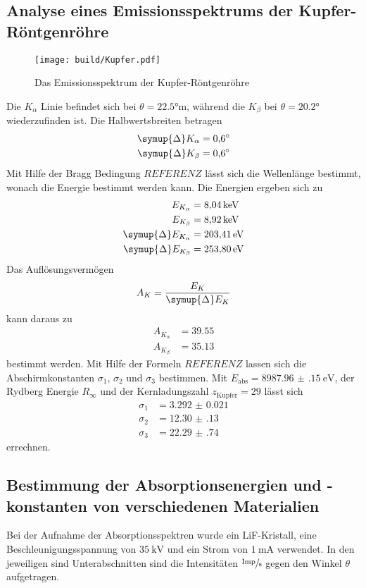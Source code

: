 \subsection{Analyse eines Emissionsspektrums der Kupfer-Röntgenröhre}
\begin{figure}
    \centering
    \caption{Das Emissionsspektrum der Kupfer-Röntgenröhre}
    \label{fig:Kupfer}
    \texttt{[image: build/Kupfer.pdf]}
\end{figure}
Die $K_\alpha$ Linie befindet sich bei  $\theta = \ang{22.5;;}$m, während die $K_\beta$ bei  $\theta = \ang{20.2;;}$ wiederzufinden ist.
Die Halbwertsbreiten betragen
\begin{align*}
    \symup{\Delta}K_\alpha  &= \ang{0.6;;} \\
    \symup{\Delta}K_\beta   &= \ang{0.6;;}
\end{align*}
Mit Hilfe der Bragg Bedingung $REFERENZ$ lässt sich die Wellenlänge bestimmt, wonach die Energie bestimmt werden kann.
Die Energien ergeben sich zu 
\begin{align*}
    E_{K_\alpha} & =  \SI{8.04}{\kilo\electronvolt} \\
    E_{K_\beta}  & =  \SI{8.92}{\kilo\electronvolt} \\
    \symup{\Delta}E_{K_\alpha} &= \SI{203.41}{\electronvolt} \\
    \symup{\Delta}E_{K_\beta}  &= \SI{253.80}{\electronvolt}
\end{align*}
Das Auflösungsvermögen 
\begin{equation}
    A_K = \frac{E_K}{\symup{\Delta}E_K}
\end{equation}
kann daraus zu 
\begin{align*}
    A_{K_\alpha}&= \num{39.55} \\
    A_{K_\beta} &= \num{35.13}
\end{align*}
bestimmt werden.
Mit Hilfe der Formeln $REFERENZ$ lassen sich die Abschirmkonstanten $\sigma_1$, $\sigma_2$ und $\sigma_3$ bestimmen.
Mit $E_\text{abs} = \SI{8987.96(15)}{\electronvolt}$, der Rydberg Energie $R_\infty$ und der Kernladungszahl
$z_\text{Kupfer} = 29 $ lässt sich
\begin{align*}
    \sigma_1 &= \num{3.292(21)}    \\
    \sigma_2 &= \num{12.30(13)}  \\
    \sigma_3 &= \num{22.29(74)}
\end{align*}
errechnen.
\subsection{Bestimmung der Absorptionsenergien und -konstanten von verschiedenen Materialien}
Bei der Aufnahme der Absorptionsspektren wurde ein LiF-Kristall, eine Beschleunigungsspannung von $\SI{35}{\kilo\volt}$ und ein Strom von $\SI{1}{\milli\ampere}$
verwendet. 
In den jeweiligen sind Unterabschnitten sind die Intensitäten $\sfrac{\text{Imp}}{\si{\second}}$ gegen den Winkel $\theta$ aufgetragen.

